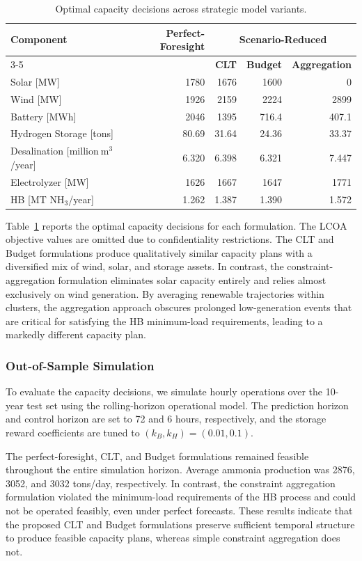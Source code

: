 \documentclass[11pt, letter]{article}
\begin{document}
\begin{table}[t]
\centering
\caption{Optimal capacity decisions across strategic model variants.}
\label{tab:strategic_comparison}
\begin{tabular}{lrrrr}
\toprule
\textbf{Component} & \textbf{Perfect-Foresight} & \multicolumn{3}{c}{\textbf{Scenario-Reduced}} \\
\cmidrule(lr){3-5}
 &  & \textbf{CLT} & \textbf{Budget} & \textbf{Aggregation} \\
\midrule
Solar [MW] & 1780 & 1676 & 1600 & 0 \\
Wind [MW] & 1926 & 2159 & 2224 & 2899 \\
Battery [MWh] & 2046 & 1395 & 716.4 & 407.1 \\
Hydrogen Storage [tons] & 80.69 & 31.64 & 24.36 & 33.37 \\
Desalination [$\mathrm{million\ m^3}$/year] & 6.320 & 6.398 & 6.321 & 7.447 \\
Electrolyzer [MW] & 1626 & 1667 & 1647 & 1771 \\
HB [MT NH$_3$/year] & 1.262 & 1.387 & 1.390 & 1.572 \\
\bottomrule
\end{tabular}
\end{table}
Table~\ref{tab:strategic_comparison} reports the optimal capacity decisions for each formulation. The LCOA objective values are omitted due to confidentiality restrictions. The CLT and Budget formulations produce qualitatively similar capacity plans with a diversified mix of wind, solar, and storage assets. In contrast, the constraint-aggregation formulation eliminates solar capacity entirely and relies almost exclusively on wind generation. By averaging renewable trajectories within clusters, the aggregation approach obscures prolonged low-generation events that are critical for satisfying the HB minimum-load requirements, leading to a markedly different capacity plan.
\subsubsection{Out-of-Sample Simulation}

To evaluate the capacity decisions, we simulate hourly operations over the 10-year test set using the rolling-horizon operational model. The prediction horizon and control horizon are set to 72 and 6 hours, respectively, and the storage reward coefficients are tuned to $(k_B,k_H)=(0.01,0.1)$.

The perfect-foresight, CLT, and Budget formulations remained feasible throughout the entire simulation horizon. Average ammonia production was 2876, 3052, and 3032 tons/day, respectively. In contrast, the constraint aggregation formulation violated the minimum-load requirements of the HB process and could not be operated feasibly, even under perfect forecasts. These results indicate that the proposed CLT and Budget formulations preserve sufficient temporal structure to produce feasible capacity plans, whereas simple constraint aggregation does not.
\end{document}
